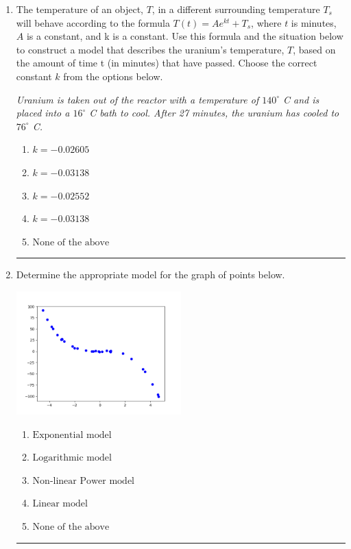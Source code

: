 \documentclass[14pt]{extbook}
\newcommand{\litem}[1]{\item#1\hspace*{-1cm}\rule{\textwidth}{0.4pt}}
\begin{document}
\begin{enumerate}
{\begin{enumerate}[label=\Alph*.]
\end{enumerate} }
\litem{
The temperature of an object, $T$, in a different surrounding temperature $T_s$ will behave according to the formula $T(t) = Ae^{kt} + T_s$, where $t$ is minutes, $A$ is a constant, and k is a constant. Use this formula and the situation below to construct a model that describes the uranium's temperature, $T$, based on the amount of time t (in minutes) that have passed. Choose the correct constant $k$ from the options below.
\begin{center}
    \textit{ Uranium is taken out of the reactor with a temperature of $140^{\circ}$ C and is placed into a $16^{\circ}$ C bath to cool. After 27 minutes, the uranium has cooled to $76^{\circ}$ C. }
\end{center}
\begin{enumerate}[label=\Alph*.]
\item \( k = -0.02605 \)
\item \( k = -0.03138 \)
\item \( k = -0.02552 \)
\item \( k = -0.03138 \)
\item \( \text{None of the above} \)

\end{enumerate} }
\litem{
Determine the appropriate model for the graph of points below.
\begin{center}
    \includegraphics[width=0.5\textwidth]{../Figures/identifyModelGraph12B.png}
\end{center}
\begin{enumerate}[label=\Alph*.]
\item \( \text{Exponential model} \)
\item \( \text{Logarithmic model} \)
\item \( \text{Non-linear Power model} \)
\item \( \text{Linear model} \)
\item \( \text{None of the above} \)


\end{enumerate}}
\end{enumerate}
\end{document}

